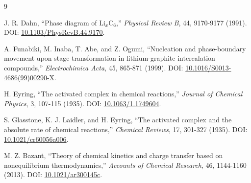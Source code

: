 \documentclass[11pt,a4paper]{article}
\begin{document}
\begin{thebibliography}{9}

J. R. Dahn, ``Phase diagram of \(\mathrm{Li}_x\mathrm{C}_6\),'' \textit{Physical Review B}, 44, 9170-9177 (1991). DOI: \href{https://doi.org/10.1103/PhysRevB.44.9170}{10.1103/PhysRevB.44.9170}.

A. Funabiki, M. Inaba, T. Abe, and Z. Ogumi, ``Nucleation and phase-boundary movement upon stage transformation in lithium-graphite intercalation compounds,'' \textit{Electrochimica Acta}, 45, 865-871 (1999). DOI: \href{https://doi.org/10.1016/S0013-4686(99)00290-X}{10.1016/S0013-4686(99)00290-X}.

H. Eyring, ``The activated complex in chemical reactions,'' \textit{Journal of Chemical Physics}, 3, 107-115 (1935). DOI: \href{https://doi.org/10.1063/1.1749604}{10.1063/1.1749604}.

S. Glasstone, K. J. Laidler, and H. Eyring, ``The activated complex and the absolute rate of chemical reactions,'' \textit{Chemical Reviews}, 17, 301-327 (1935). DOI: \href{https://doi.org/10.1021/cr60056a006}{10.1021/cr60056a006}.

M. Z. Bazant, ``Theory of chemical kinetics and charge transfer based on nonequilibrium thermodynamics,'' \textit{Accounts of Chemical Research}, 46, 1144-1160 (2013). DOI: \href{https://doi.org/10.1021/ar300145c}{10.1021/ar300145c}.

\end{thebibliography}
\end{document}
